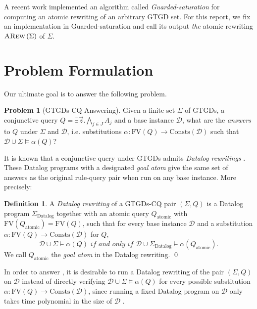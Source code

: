 \documentclass[12pt]{report}
\theoremstyle{plain}
\theoremstyle{definition}
\newtheorem{problem}[theorem]{Problem}
\newtheorem{definition}[theorem]{Definition}
\def\FV{{\mathrm{FV}}}
\def\Consts{{\mathrm{Consts}}}
\newcommand{\ARew}[1]{\ensuremath{\normalfont{\textsc{ARew}} \left( #1 \right)}}
\begin{document}
A recent work \cite{benedikt_buron_germano_kappelmann_motik_2022} implemented an algorithm called \emph{Guarded-saturation} for computing an atomic rewriting of an arbitrary GTGD set. For this report, we fix an implementation in Guarded-saturation and call its output \emph{the} atomic rewriting $\ARew{\Sigma}$ of $\Sigma$.

\section{Problem Formulation}

Our ultimate goal is to answer the following problem.

\begin{problem}[GTGDs-CQ Answering]
\label{GTGDs-CQ-Answering}
  Given a finite set $\Sigma$ of GTGDs, a conjunctive query $Q = \exists \vec{z}. \bigwedge_{j \in J} A_j$ and a base instance $\mathcal{D}$, what are the \emph{answers} to $Q$ under $\Sigma$ and $\mathcal{D}$, i.e. substitutions $\alpha: \FV(Q) \rightarrow \Consts(\mathcal{D})$ such that $\mathcal{D} \cup \Sigma \models \alpha(Q)$?
\end{problem}

It is known that a conjunctive query under GTGDs admits \emph{Datalog rewritings} \cite{barany_benedikt_cate_2013}. These Datalog programs with a designated \emph{goal atom} give the same set of answers as the original rule-query pair when run on any base instance. More precisely:

\begin{definition}
  A \emph{Datalog rewriting} of a GTGDs-CQ pair $(\Sigma, Q)$ is a Datalog program $\Sigma_\mathrm{Datalog}$ together with an atomic query $Q_\mathrm{atomic}$ with $\FV(Q_\mathrm{atomic}) = \FV(Q)$, such that for every base instance $\mathcal{D}$ and a substitution $\alpha: \FV(Q) \rightarrow \Consts(\mathcal{D})$ for $Q$, $$\mathcal{D} \cup \Sigma \models \alpha(Q) \textit{ if and only if } \mathcal{D} \cup \Sigma_\mathrm{Datalog} \models \alpha(Q_\mathrm{atomic}).$$
  We call $Q_\mathrm{atomic}$ the \emph{goal atom} in the Datalog rewriting.
  \qed
\end{definition}

In order to answer , it is desirable to run a Datalog rewriting of the pair $(\Sigma, Q)$ on $\mathcal{D}$ instead of directly verifying $\mathcal{D} \cup \Sigma \models \alpha(Q)$ for every possible substitution $\alpha: \FV(Q) \rightarrow \Consts(\mathcal{D})$, since running a fixed Datalog program on $\mathcal{D}$ only takes time polynomial in the size of $\mathcal{D}$ \cite{dantsin_eiter_gottlob_voronkov_2001}.
\end{document}
